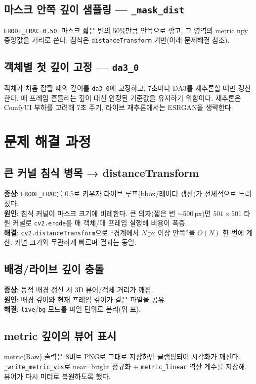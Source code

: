 \section{마스크 안쪽 깊이 샘플링 — \texttt{\_mask\_dist}}
\texttt{ERODE\_FRAC=0.50}: 마스크 짧은 변의 50\%만큼 안쪽으로 깎고, 그 영역의
metric npy 중앙값을 거리로 쓴다. 침식은 \texttt{distanceTransform} 기반(아래 문제해결
참조).

\section{객체별 첫 깊이 고정 — \texttt{da3\_0}}
객체가 처음 잡힐 때의 깊이를 \texttt{da3\_0}에 고정하고, 7초마다 DA3를 재추론할
때만 갱신한다. 매 프레임 흔들리는 깊이 대신 안정된 기준값을 유지하기 위함이다.
재추론은 ComfyUI 부하를 고려해 7초 주기, 라이브 재추론에서는 ESRGAN을 생략한다.

\chapter{문제 해결 과정}

\section{큰 커널 침식 병목 → distanceTransform}
\textbf{증상}: \texttt{ERODE\_FRAC}를 0.5로 키우자 라이브 루프(bbox/레이더 갱신)가
전체적으로 느려졌다.\\
\textbf{원인}: 침식 커널이 마스크 크기에 비례한다. 큰 의자(짧은 변 $\sim$500\,px)면
$501\times501$ 타원 커널로 \texttt{cv2.erode}를 매 객체/매 프레임 실행해 비용이 폭증.\\
\textbf{해결}: \texttt{cv2.distanceTransform}으로 ``경계에서 $N$\,px 이상 안쪽''을
$O(N)$ 한 번에 계산. 커널 크기와 무관하게 빠르며 결과는 동일.

\section{배경/라이브 깊이 충돌}
\textbf{증상}: 동적 배경 갱신 시 3D 뷰어/객체 거리가 깨짐.\\
\textbf{원인}: 배경 깊이와 현재 프레임 깊이가 같은 파일을 공유.\\
\textbf{해결}: \texttt{live}/\texttt{bg} 모드를 파일 단위로 분리(위 표).

\section{metric 깊이의 뷰어 표시}
metric(Raw) 출력은 8비트 PNG로 그대로 저장하면 클램핑되어 시각화가 깨진다.
\texttt{\_write\_metric\_vis}로 near=bright 정규화 + \texttt{metric\_linear} 역산
계수를 저장해, 뷰어가 다시 미터로 복원하도록 했다.
